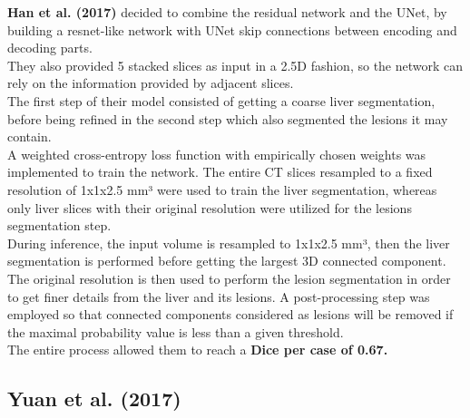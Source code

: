 \textbf{Han et al. (2017)} decided to combine the residual network and
the UNet, by building a resnet-like network with UNet skip connections
between encoding and decoding parts.\\
They also provided 5 stacked slices as input in a 2.5D fashion, so the
network can rely on the information provided by adjacent slices.\\
The first step of their model consisted of getting a coarse liver
segmentation, before being refined in the second step which also
segmented the lesions it may contain.\\
A weighted cross-entropy loss function with empirically chosen weights
was implemented to train the network. The entire CT slices resampled to
a fixed resolution of 1x1x2.5 mm³ were used to train the liver
segmentation, whereas only liver slices with their original resolution
were utilized for the lesions segmentation step.\\
During inference, the input volume is resampled to 1x1x2.5 mm³, then the
liver segmentation is performed before getting the largest 3D connected
component. The original resolution is then used to perform the lesion
segmentation in order to get finer details from the liver and its
lesions. A post-processing step was employed so that connected
components considered as lesions will be removed if the maximal
probability value is less than a given threshold.\\
The entire process allowed them to reach a \textbf{Dice per case of
0.67.}

\subsection*{Yuan et al. (2017)}\label{yuan-et-al.-2017}

